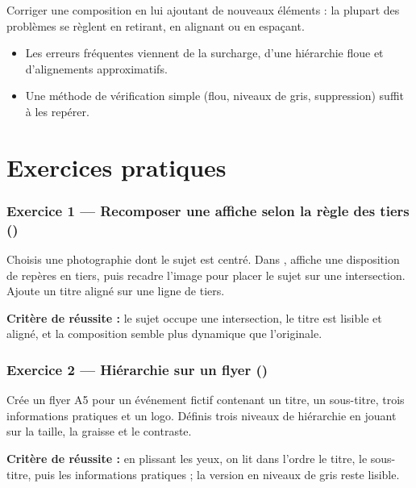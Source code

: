 \begin{erreur}
Corriger une composition en lui ajoutant de nouveaux éléments : la plupart des problèmes se règlent en retirant, en alignant ou en espaçant.
\end{erreur}

\begin{retenir}
\begin{itemize}
  \item Les erreurs fréquentes viennent de la surcharge, d'une hiérarchie floue et d'alignements approximatifs.
  \item Une méthode de vérification simple (flou, niveaux de gris, suppression) suffit à les repérer.
\end{itemize}
\end{retenir}

\section*{Exercices pratiques}

\subsubsection*{Exercice 1 --- Recomposer une affiche selon la règle des tiers ()}

Choisis une photographie dont le sujet est centré. Dans , affiche une disposition de repères en tiers, puis recadre l'image pour placer le sujet sur une intersection. Ajoute un titre aligné sur une ligne de tiers.

\textbf{Critère de réussite :} le sujet occupe une intersection, le titre est lisible et aligné, et la composition semble plus dynamique que l'originale.

\subsubsection*{Exercice 2 --- Hiérarchie sur un flyer ()}

Crée un flyer A5 pour un événement fictif contenant un titre, un sous-titre, trois informations pratiques et un logo. Définis trois niveaux de hiérarchie en jouant sur la taille, la graisse et le contraste.

\textbf{Critère de réussite :} en plissant les yeux, on lit dans l'ordre le titre, le sous-titre, puis les informations pratiques ; la version en niveaux de gris reste lisible.

